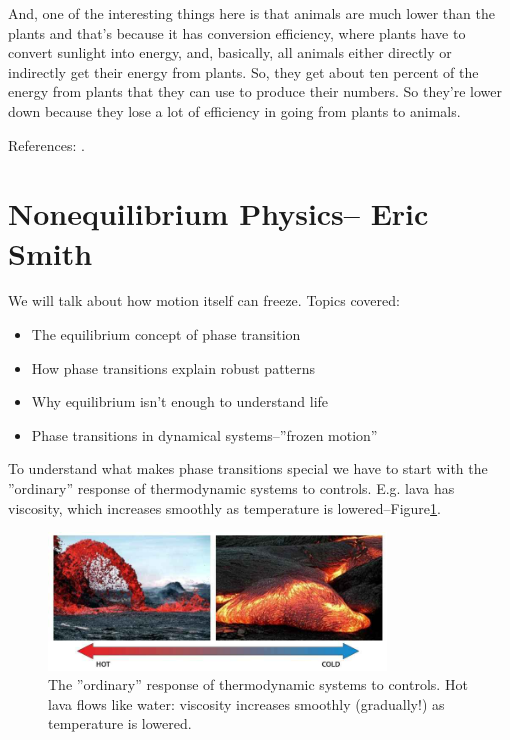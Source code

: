 \documentclass[]{article}
\begin{document}
And, one of the interesting things here
is that animals are much lower
than the plants
and that's because it has
conversion efficiency,
where plants have to convert
sunlight into energy,
and, basically, all animals
either directly or indirectly
get their energy from plants.
So, they get about ten percent
of the energy from plants
that they can use
to produce their numbers.
So they're lower down
because they lose a lot of efficiency
in going from plants to animals.

References: \cite{sibly2012metabolic,battley1987energetics,odum1976energy,odum1983systems,schmidt1997animal,brown2004toward,kempes2017thermodynamic}.

\section[Nonequilibrium Physics]{Nonequilibrium Physics-- Eric Smith}


We will talk about how motion itself can freeze. Topics covered:
\begin{itemize}
	\item The equilibrium concept of phase transition
	
	\item How phase transitions explain robust patterns
	
	\item Why equilibrium isn’t enough to understand life
	
	\item Phase transitions in dynamical systems--''frozen motion''
\end{itemize}

To understand what makes phase transitions special we have to start with the ''ordinary'' response of thermodynamic systems to controls. E.g. lava has viscosity, which increases smoothly as temperature is lowered--Figure\ref{fig:lava}.

\begin{figure}[H]
	\begin{center}
		\caption[The ''ordinary'' response of thermodynamic systems to controls]{The ''ordinary'' response of thermodynamic systems to controls.  Hot lava flows like water: viscosity increases smoothly (gradually!) as temperature is lowered.}\label{fig:lava}
		\includegraphics[width=0.8\textwidth]{lava}
	\end{center}
\end{figure}
\end{document}
